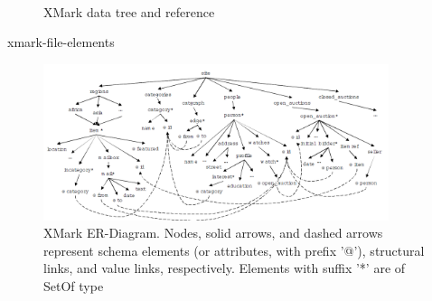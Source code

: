 \begin{figure}[h]

	\centering
	\\
	\centering
	\caption{XMark data tree and reference~\citep{xmark/original}}
	\label{fig:xmark-tree-reference}
\end{figure}
xmark-file-elements

\begin{figure}[h]
	\centering
	\includegraphics[width=0.90\textwidth]{img/xmark-schema-4}
	\caption{XMark ER-Diagram. Nodes, solid arrows, and dashed arrows represent schema elements (or attributes, with prefix '@'), structural links, and value links, respectively. Elements with suffix '*' are of SetOf type\citep{xmark/schema-sumerize}}
	\label{fig:xmark-schema}
\end{figure}

